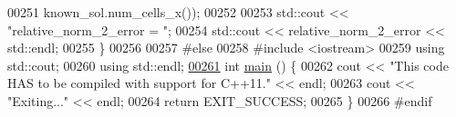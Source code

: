 \begin{DoxyCode}
00251                                     known\_sol.num\_cells\_x());
00252 
00253   std::cout << \textcolor{stringliteral}{"relative\_norm\_2\_error = "};
00254   std::cout << relative\_norm\_2\_error << std::endl;
00255 \}
00256 
00257 \textcolor{preprocessor}{#else}
00258 \textcolor{preprocessor}{#include <iostream>}
00259 \textcolor{keyword}{using} std::cout;
00260 \textcolor{keyword}{using} std::endl;
\hypertarget{poisson__1d_8cc_source_l00261}{}\hyperlink{poisson__1d_8cc_ae66f6b31b5ad750f1fe042a706a4e3d4}{00261} \textcolor{keywordtype}{int} \hyperlink{poisson__1d_8cc_ae66f6b31b5ad750f1fe042a706a4e3d4}{main} () \{
00262   cout << \textcolor{stringliteral}{"This code HAS to be compiled with support for C++11."} << endl;
00263   cout << \textcolor{stringliteral}{"Exiting..."} << endl;
00264   \textcolor{keywordflow}{return} EXIT\_SUCCESS;
00265 \}
00266 \textcolor{preprocessor}{#endif}
\end{DoxyCode}

